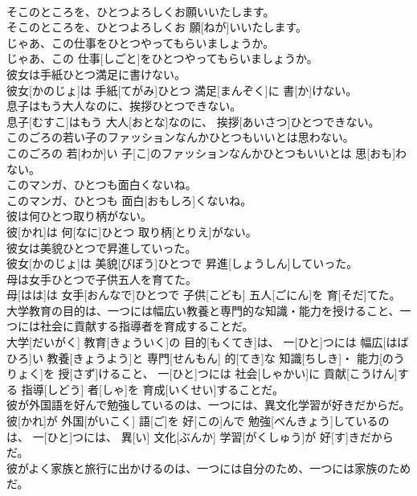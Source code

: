 \documentclass[8pt]{extreport}
\begin{document}
\begin{CJK}{UTF8}{min}
\\	そこのところを、ひとつよろしくお願いいたします。	
\\	そこのところを、ひとつよろしくお 願[ねが]いいたします。
\\	じゃあ、この仕事をひとつやってもらいましょうか。	
\\	じゃあ、この 仕事[しごと]をひとつやってもらいましょうか。
\\	彼女は手紙ひとつ満足に書けない。	
\\	彼女[かのじょ]は 手紙[てがみ]ひとつ 満足[まんぞく]に 書[か]けない。
\\	息子はもう大人なのに、挨拶ひとつできない。	
\\	息子[むすこ]はもう 大人[おとな]なのに、 挨拶[あいさつ]ひとつできない。
\\	このごろの若い子のファッションなんかひとつもいいとは思わない。	
\\	このごろの 若[わか]い 子[こ]のファッションなんかひとつもいいとは 思[おも]わない。
\\	このマンガ、ひとつも面白くないね。	
\\	このマンガ、ひとつも 面白[おもしろ]くないね。
\\	彼は何ひとつ取り柄がない。	
\\	彼[かれ]は 何[なに]ひとつ 取り柄[とりえ]がない。
\\	彼女は美貌ひとつで昇進していった。	
\\	彼女[かのじょ]は 美貌[びぼう]ひとつで 昇進[しょうしん]していった。
\\	母は女手ひとつで子供五人を育てた。	
\\	母[はは]は 女手[おんなで]ひとつで 子供[こども] 五人[ごにん]を 育[そだ]てた。
\\	大学教育の目的は、一つには幅広い教養と専門的な知識・能力を授けること、一つには社会に貢献する指導者を育成することだ。	
\\	大学[だいがく] 教育[きょういく]の 目的[もくてき]は、 一[ひと]つには 幅広[はばひろ]い 教養[きょうよう]と 専門[せんもん] 的[てき]な 知識[ちしき]・ 能力[のうりょく]を 授[さず]けること、 一[ひと]つには 社会[しゃかい]に 貢献[こうけん]する 指導[しどう] 者[しゃ]を 育成[いくせい]することだ。
\\	彼が外国語を好んで勉強しているのは、一つには、異文化学習が好きだからだ。	
\\	彼[かれ]が 外国[がいこく] 語[ご]を 好[この]んで 勉強[べんきょう]しているのは、 一[ひと]つには、 異[い] 文化[ぶんか] 学習[がくしゅう]が 好[す]きだからだ。
\\	彼がよく家族と旅行に出かけるのは、一つには自分のため、一つには家族のためだ。	

\end{CJK}
\end{document}
